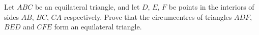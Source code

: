 Let $ABC$ be an equilateral triangle, and let $D$, $E$, $F$ be points in the interiors of sides $AB$, $BC$, $CA$ respectively. Prove that the circumcentres of triangles $ADF$, $BED$ and $CFE$ form an equilateral triangle.
